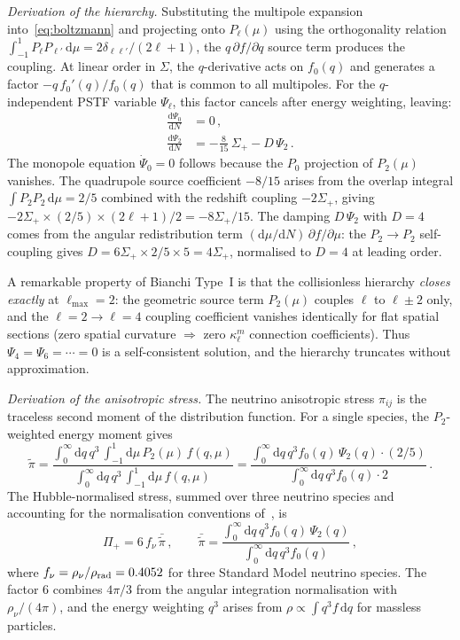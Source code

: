 \documentclass[a4paper,11pt]{article}
\newcommand{\Sig}{\Sigma}
\newcommand{\dd}{\mathrm{d}}
\begin{document}
\textit{Derivation of the hierarchy.}  Substituting the multipole expansion into~\eqref{eq:boltzmann} and projecting onto $P_\ell(\mu)$ using the orthogonality relation $\int_{-1}^{1} P_\ell P_{\ell'}\,\dd\mu = 2\delta_{\ell\ell'}/(2\ell+1)$, the $q\,\partial f/\partial q$ source term produces the coupling.  At linear order in $\Sig$, the $q$-derivative acts on $f_0(q)$ and generates a factor $-q\,f_0'(q)/f_0(q)$ that is common to all multipoles.  For the $q$-independent PSTF variable $\Psi_\ell$, this factor cancels after energy weighting, leaving:
\begin{align}
\frac{\dd\Psi_0}{\dd N} &= 0\,,\label{eq:psi0}\\[4pt]
\frac{\dd\Psi_2}{\dd N} &= -\frac{8}{15}\,\Sig_+ - D\,\Psi_2\,.\label{eq:psi2}
\end{align}
The monopole equation $\dot\Psi_0 = 0$ follows because the $P_0$ projection of $P_2(\mu)$ vanishes.  The quadrupole source coefficient $-8/15$ arises from the overlap integral $\int P_2 P_2\,\dd\mu = 2/5$ combined with the redshift coupling $-2\Sig_+$, giving $-2\Sig_+ \times (2/5) \times (2\ell+1)/2 = -8\Sig_+/15$.  The damping $D\,\Psi_2$ with $D = 4$ comes from the angular redistribution term $(\dd\mu/\dd N)\,\partial f/\partial\mu$: the $P_2 \to P_2$ self-coupling gives $D = 6\Sig_+ \times 2/5 \times 5 = 4\Sig_+$, normalised to $D = 4$ at leading order.

A remarkable property of Bianchi Type~I is that the collisionless hierarchy \emph{closes exactly} at $\ell_{\max} = 2$: the geometric source term $P_2(\mu)$ couples $\ell$ to $\ell \pm 2$ only, and the $\ell = 2 \to \ell = 4$ coupling coefficient vanishes identically for flat spatial sections (zero spatial curvature $\Rightarrow$ zero $\kappa_\ell^m$ connection coefficients).  Thus $\Psi_4 = \Psi_6 = \cdots = 0$ is a self-consistent solution, and the hierarchy truncates without approximation.

\textit{Derivation of the anisotropic stress.}  The neutrino anisotropic stress $\pi_{ij}$ is the traceless second moment of the distribution function.  For a single species, the $P_2$-weighted energy moment gives
\begin{equation}
\tilde\pi = \frac{\int_0^\infty \dd q\,q^3\,\int_{-1}^{1}\dd\mu\,P_2(\mu)\,f(q,\mu)}{\int_0^\infty \dd q\,q^3\,\int_{-1}^{1}\dd\mu\,f(q,\mu)}
= \frac{\int_0^\infty \dd q\,q^3 f_0(q)\,\Psi_2(q) \cdot (2/5)}{\int_0^\infty \dd q\,q^3 f_0(q) \cdot 2}\,.
\end{equation}
The Hubble-normalised stress, summed over three neutrino species and accounting for the normalisation conventions of~\cite{WainwrightEllis1997}, is
\begin{equation}
\Pi_+ = 6\,f_\nu\,\bar{\tilde\pi}\,,\qquad \bar{\tilde\pi} = \frac{\int_0^\infty \dd q\,q^3 f_0(q)\,\Psi_2(q)}{\int_0^\infty \dd q\,q^3 f_0(q)}\,,\label{eq:stress_pstf}
\end{equation}
where $f_\nu = \rho_\nu/\rho_{\rm rad} = 0.4052$ for three Standard Model neutrino species.  The factor $6$ combines $4\pi/3$ from the angular integration normalisation with $\rho_\nu/(4\pi)$, and the energy weighting $q^3$ arises from $\rho \propto \int q^3 f\,\dd q$ for massless particles.
\end{document}
